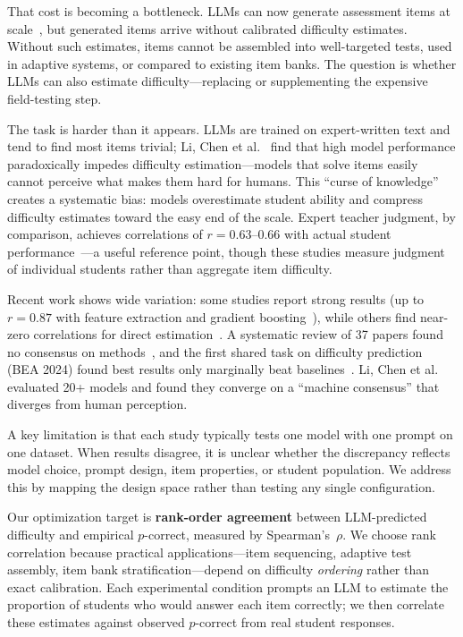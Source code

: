 \documentclass[runningheads]{llncs}
\begin{document}
That cost is becoming a bottleneck. LLMs can now generate assessment items at scale~\cite{moore2024}, but generated items arrive without calibrated difficulty estimates. Without such estimates, items cannot be assembled into well-targeted tests, used in adaptive systems, or compared to existing item banks. The question is whether LLMs can also estimate difficulty---replacing or supplementing the expensive field-testing step.

The task is harder than it appears. LLMs are trained on expert-written text and tend to find most items trivial; Li, Chen et al.~\cite{lichen2025} find that high model performance paradoxically impedes difficulty estimation---models that solve items easily cannot perceive what makes them hard for humans. This ``curse of knowledge'' creates a systematic bias: models overestimate student ability and compress difficulty estimates toward the easy end of the scale. Expert teacher judgment, by comparison, achieves correlations of $r=0.63$--$0.66$ with actual student performance~\cite{hoge1989,sudkamp2012}---a useful reference point, though these studies measure judgment of individual students rather than aggregate item difficulty.

Recent work shows wide variation: some studies report strong results (up to $r=0.87$ with feature extraction and gradient boosting~\cite{razavi2025}), while others find near-zero correlations for direct estimation~\cite{acquaye2025}. A systematic review of 37 papers found no consensus on methods~\cite{peters2025}, and the first shared task on difficulty prediction (BEA 2024) found best results only marginally beat baselines~\cite{yaneva2024}. Li, Chen et al.~\cite{lichen2025} evaluated 20+ models and found they converge on a ``machine consensus'' that diverges from human perception.

A key limitation is that each study typically tests one model with one prompt on one dataset. When results disagree, it is unclear whether the discrepancy reflects model choice, prompt design, item properties, or student population. We address this by mapping the design space rather than testing any single configuration.

Our optimization target is \textbf{rank-order agreement} between LLM-predicted difficulty and empirical $p$-correct, measured by Spearman's~$\rho$. We choose rank correlation because practical applications---item sequencing, adaptive test assembly, item bank stratification---depend on difficulty \emph{ordering} rather than exact calibration. Each experimental condition prompts an LLM to estimate the proportion of students who would answer each item correctly; we then correlate these estimates against observed $p$-correct from real student responses.
\end{document}
